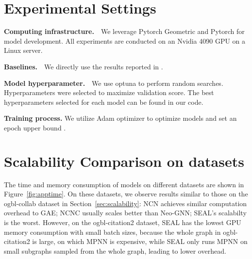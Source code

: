 \documentclass{article}
\theoremstyle{plain}
\theoremstyle{definition}
\theoremstyle{remark}
\begin{document}
\section{Experimental Settings}\label{app::experimentsetting}

{\bf Computing infrastructure.}~~We leverage Pytorch Geometric and Pytorch for model development. All experiments are conducted on an Nvidia 4090 GPU on a Linux server. 

{\bf Baselines.}~~We directly use the results reported in \citep{Gsketch}.

{\bf Model hyperparameter.}~~We use optuna to perform random searches. Hyperparameters were selected to maximize validation score. The best hyperparameters selected for each model can be found in our code. 


{\bf Training process.} We utilize Adam optimizer to optimize models and set an epoch upper bound . 



\section{Scalability Comparison on datasets}\label{app:time}
The time and memory consumption of models on different datasets are shown in Figure~\ref{fig:apptime}. On these datasets, we observe results similar to those on the ogbl-collab dataset in Section~\ref{sec:scalability}: NCN achieves similar computation overhead to GAE; NCNC usually scales better than Neo-GNN; SEAL's scalabilty is the worst. However, on the ogbl-citation2 dataset, SEAL has the lowest GPU memory consumption with small batch sizes, because the whole graph in ogbl-citation2 is large, on which MPNN is expensive, while SEAL only runs MPNN on small subgraphs sampled from the whole graph, leading to lower overhead.
\end{document}
